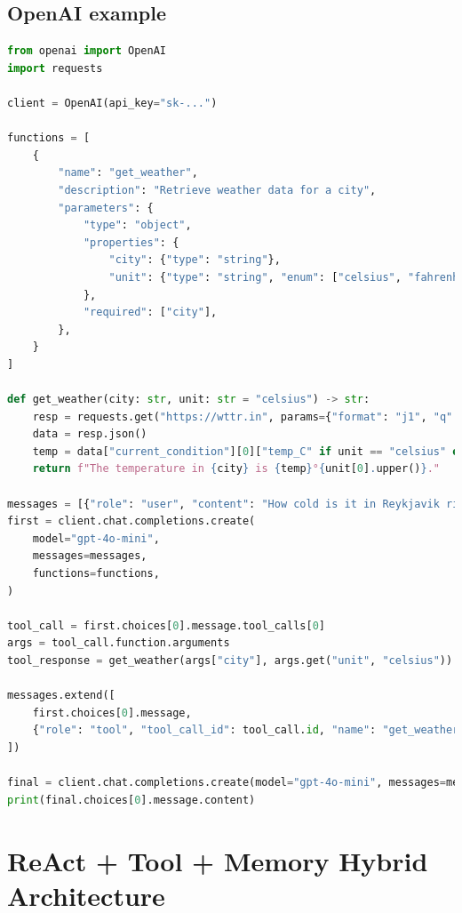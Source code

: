 \documentclass{article}
\begin{document}
\subsection{OpenAI example}
\begin{lstlisting}[language=Python,caption={Calling an external weather API via OpenAI function calling}]
from openai import OpenAI
import requests

client = OpenAI(api_key="sk-...")

functions = [
    {
        "name": "get_weather",
        "description": "Retrieve weather data for a city",
        "parameters": {
            "type": "object",
            "properties": {
                "city": {"type": "string"},
                "unit": {"type": "string", "enum": ["celsius", "fahrenheit"]},
            },
            "required": ["city"],
        },
    }
]

def get_weather(city: str, unit: str = "celsius") -> str:
    resp = requests.get("https://wttr.in", params={"format": "j1", "q": city}, timeout=10)
    data = resp.json()
    temp = data["current_condition"][0]["temp_C" if unit == "celsius" else "temp_F"]
    return f"The temperature in {city} is {temp}°{unit[0].upper()}."

messages = [{"role": "user", "content": "How cold is it in Reykjavik right now?"}]
first = client.chat.completions.create(
    model="gpt-4o-mini",
    messages=messages,
    functions=functions,
)

tool_call = first.choices[0].message.tool_calls[0]
args = tool_call.function.arguments
tool_response = get_weather(args["city"], args.get("unit", "celsius"))

messages.extend([
    first.choices[0].message,
    {"role": "tool", "tool_call_id": tool_call.id, "name": "get_weather", "content": tool_response},
])

final = client.chat.completions.create(model="gpt-4o-mini", messages=messages)
print(final.choices[0].message.content)
\end{lstlisting}

\section{ReAct + Tool + Memory Hybrid Architecture}
\end{document}
